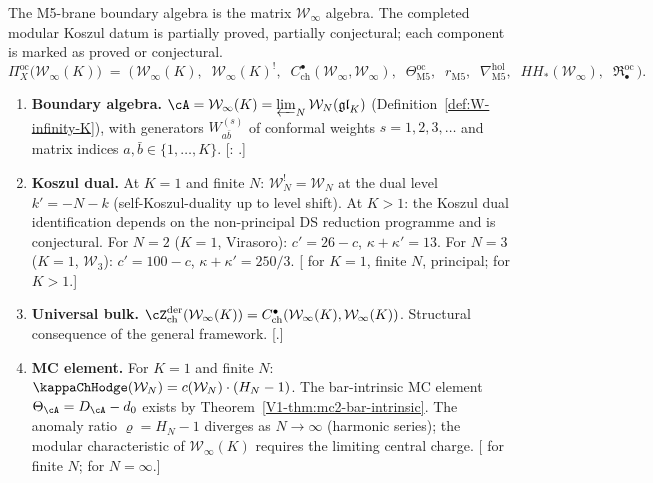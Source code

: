 \begin{conjecture}
\label{comp:platonic-M5}
The M5-brane boundary algebra is the matrix $\mathcal{W}_\infty$
algebra. The completed modular Koszul datum is partially proved,
partially conjectural; each component is marked as proved or conjectural.
\begin{equation}\label{eq:platonic-M5}
\Pi^{\mathrm{oc}}_X\!\bigl(\mathcal{W}_\infty(K)\bigr)
\;=\;
\bigl(\,
\mathcal{W}_\infty(K),\;\;
\mathcal{W}_\infty(K)^!,\;\;
C^\bullet_{\mathrm{ch}}(\mathcal{W}_\infty, \mathcal{W}_\infty),\;\;
\Theta^{\mathrm{oc}}_{\mathrm{M5}},\;\;
r_{\mathrm{M5}},\;\;
\nabla^{\mathrm{hol}}_{\mathrm{M5}},\;\;
HH_*(\mathcal{W}_\infty),\;\;
\mathfrak{R}^{\mathrm{oc}}_\bullet
\,\bigr).
\end{equation}
\begin{enumerate}[label=\textup{(\roman*)},nosep]
\item \textbf{Boundary algebra.}
 $\cA = \mathcal{W}_\infty(K) = \varprojlim_N \mathcal{W}_N(\mathfrak{gl}_K)$
 \textup{(}Definition~\textup{\ref{def:W-infinity-K}}\textup{)},
 with generators $W^{(s)}_{a\bar b}$ of conformal weights
 $s = 1, 2, 3, \ldots$ and matrix indices $a, \bar b \in \{1, \ldots, K\}$.
 \textup{[\ClaimStatusProvedElsewhere: \cite{ProchazkRapcak2018}.]}

\item \textbf{Koszul dual.}
 At $K = 1$ and finite $N$:
 $\mathcal{W}_N^! = \mathcal{W}_N$ at the dual level
 $k' = -N - k$ (self-Koszul-duality up to level shift).
 At $K > 1$: the Koszul dual identification depends on the
 non-principal DS reduction programme and is conjectural.
 For $N = 2$ ($K = 1$, Virasoro): $c' = 26 - c$, $\kappa + \kappa' = 13$.
 For $N = 3$ ($K = 1$, $\mathcal{W}_3$): $c' = 100 - c$,
 $\kappa + \kappa' = 250/3$.
 \textup{[\ClaimStatusProvedHere{} for $K = 1$, finite $N$, principal;
 \ClaimStatusConjectured{} for $K > 1$.]}

\item \textbf{Universal bulk.}
 $\cZ^{\mathrm{der}}_{\mathrm{ch}}(\mathcal{W}_\infty(K))
 = C^\bullet_{\mathrm{ch}}(\mathcal{W}_\infty(K), \mathcal{W}_\infty(K))$.
 Structural consequence of the general framework.
 \textup{[\ClaimStatusProvedHere.]}

\item \textbf{MC element.}
 For $K = 1$ and finite $N$:
 $\kappaChHodge(\mathcal{W}_N) = c(\mathcal{W}_N) \cdot (H_N - 1)$.
 The bar-intrinsic MC element $\Theta_\cA = D_\cA - d_0$ exists
 by Theorem~\textup{\ref*{V1-thm:mc2-bar-intrinsic}}.
 The anomaly ratio $\varrho = H_N - 1$ diverges as $N \to \infty$
 (harmonic series); the modular characteristic of
 $\mathcal{W}_\infty(K)$ requires the limiting central charge.
 \textup{[\ClaimStatusProvedHere{} for finite $N$;
 \ClaimStatusConjectured{} for $N = \infty$.]}


\end{enumerate}
\end{conjecture}
